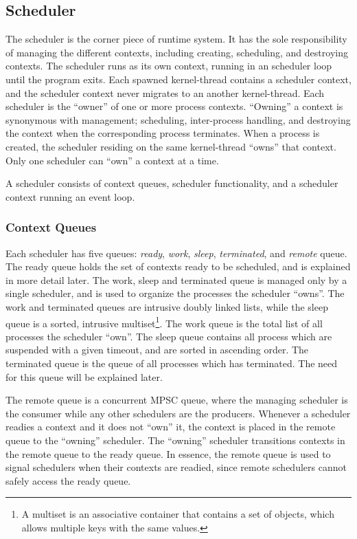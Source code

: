 \subsection{Scheduler}
\label{subsec:scheduler}

The scheduler is the corner piece of runtime system. It has the sole responsibility of managing the different contexts, including creating, scheduling, and destroying contexts. The scheduler runs as its own context, running in an scheduler loop until the program exits. Each spawned kernel\hyp{}thread contains a scheduler context, and the scheduler context never migrates to an another kernel\hyp{}thread. Each scheduler is the ``owner'' of one or more process contexts. ``Owning'' a context is synonymous with management; scheduling, inter\hyp{}process handling, and destroying the context when the corresponding process terminates. When a process is created, the scheduler residing on the same kernel\hyp{}thread ``owns'' that context. Only one scheduler can ``own'' a context at a time.

A scheduler consists of context queues, scheduler functionality, and a scheduler context running an event loop.


\FloatBarrier
\subsubsection{Context Queues}

Each scheduler has five queues: \textit{ready}, \textit{work}, \textit{sleep}, \textit{terminated}, and \textit{remote} queue. The ready queue holds the set of contexts ready to be scheduled, and is explained in more detail later. The work, sleep and terminated queue is managed only by a single scheduler, and is used to organize the processes the scheduler ``owns''. The work and terminated queues are intrusive doubly linked lists, while the sleep queue is a sorted, intrusive multiset\footnote{A multiset is an associative container that contains a set of objects, which allows multiple keys with the same values.}. The work queue is the total list of all processes the scheduler ``own''. The sleep queue contains all process which are suspended with a given timeout, and are sorted in ascending order. The terminated queue is the queue of all processes which has terminated. The need for this queue will be explained later. 

The remote queue is a concurrent MPSC queue, where the managing scheduler is the consumer while any other schedulers are the producers. Whenever a scheduler readies a context and it does not ``own'' it, the context is placed in the remote queue to the ``owning'' scheduler. The ``owning'' scheduler transitions contexts in the remote queue to the ready queue. In essence, the remote queue is used to signal schedulers when their contexts are readied, since remote schedulers cannot safely access the ready queue.

